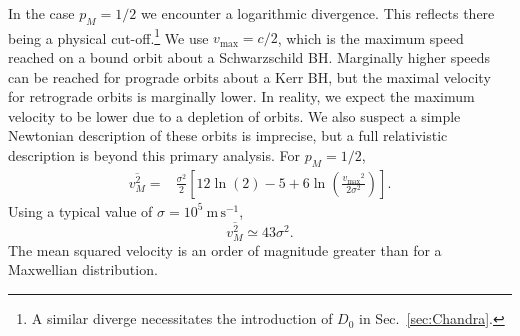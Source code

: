\documentclass[useAMS,usedcolumn,usegraphicx,usenatbib]{mn2e}
\newcommand{\secref}[1]{Sec.~\ref{sec:#1}}
\newcommand{\units}[1]{\ensuremath{~\mathrm{#1}}}
\newcommand{\sub}[1]{\ensuremath{_\mathrm{#1}}}
\begin{document}
\begin{onecolumn}
In the case $p_M = 1/2$ we encounter a logarithmic divergence. This reflects there being a physical cut-off.\footnote{A similar diverge necessitates the introduction of $D_0$ in \secref{Chandra}.} We use $v\sub{max} = c/2$, which is the maximum speed reached on a bound orbit about a Schwarzschild BH. Marginally higher speeds can be reached for prograde orbits about a Kerr BH, but the maximal velocity for retrograde orbits is marginally lower. In reality, we expect the maximum velocity to be lower due to a depletion of orbits. We also suspect a simple Newtonian description of these orbits is imprecise, but a full relativistic description is beyond this primary analysis. For $p_M = 1/2$,
\begin{align}
\overline{v^2_{M}} = {} & \frac{\sigma^2}{2}\left[12\ln(2) - 5 + 6 \ln\left(\frac{v\sub{max}^2}{2\sigma^2}\right)\right].
\end{align}
Using a typical value of $\sigma = 10^5\units{m\,s^{-1}}$,
\begin{equation}
\overline{v^2_{M}} \simeq 43\sigma^2.
\end{equation}
The mean squared velocity is an order of magnitude greater than for a Maxwellian distribution.


\end{onecolumn}
\end{document}
